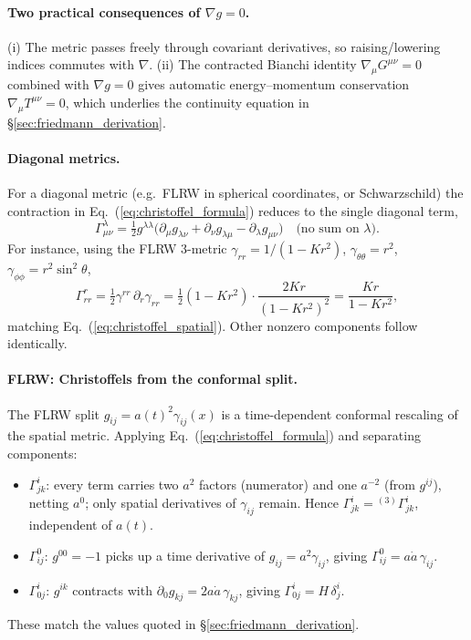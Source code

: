 \documentclass[12pt]{article}
\begin{document}
\paragraph{Two practical consequences of $\nabla g = 0$.}
(i) The metric passes freely through covariant derivatives, so
raising/lowering indices commutes with $\nabla$.  (ii) The contracted
Bianchi identity $\nabla_\mu G^{\mu\nu} = 0$ combined with
$\nabla g = 0$ gives automatic energy--momentum conservation
$\nabla_\mu T^{\mu\nu} = 0$, which underlies the continuity equation
in \S\ref{sec:friedmann_derivation}.

\paragraph{Diagonal metrics.}
For a diagonal metric (e.g.\ FLRW in spherical coordinates, or
Schwarzschild) the contraction in Eq.~(\ref{eq:christoffel_formula})
reduces to the single diagonal term,
%
\begin{equation}
  \Gamma^\lambda_{\mu\nu}
  = \tfrac{1}{2}g^{\lambda\lambda}\bigl(\partial_\mu g_{\lambda\nu}
    + \partial_\nu g_{\lambda\mu} - \partial_\lambda g_{\mu\nu}\bigr)
  \quad\text{(no sum on $\lambda$).}
\end{equation}
%
For instance, using the FLRW 3-metric $\gamma_{rr}=1/(1-Kr^2)$,
$\gamma_{\theta\theta}=r^2$, $\gamma_{\phi\phi}=r^2\sin^2\theta$,
%
\begin{equation}
  \Gamma^r_{rr}
  = \tfrac{1}{2}\gamma^{rr}\,\partial_r\gamma_{rr}
  = \tfrac{1}{2}(1-Kr^2)\cdot\frac{2Kr}{(1-Kr^2)^2}
  = \frac{Kr}{1-Kr^2},
\end{equation}
%
matching Eq.~(\ref{eq:christoffel_spatial}).  Other nonzero components
follow identically.

\paragraph{FLRW: Christoffels from the conformal split.}
The FLRW split $g_{ij} = a(t)^2\gamma_{ij}(x)$ is a time-dependent
conformal rescaling of the spatial metric.  Applying
Eq.~(\ref{eq:christoffel_formula}) and separating components:
\begin{itemize}
  \item $\Gamma^i_{jk}$: every term carries two $a^2$ factors
    (numerator) and one $a^{-2}$ (from $g^{ij}$), netting $a^0$; only
    spatial derivatives of $\gamma_{ij}$ remain.  Hence $\Gamma^i_{jk}
    = {}^{(3)}\Gamma^i_{jk}$, independent of $a(t)$.
  \item $\Gamma^0_{ij}$: $g^{00}=-1$ picks up a time derivative of
    $g_{ij}=a^2\gamma_{ij}$, giving $\Gamma^0_{ij} = a\dot
    a\,\gamma_{ij}$.
  \item $\Gamma^i_{0j}$: $g^{ik}$ contracts with $\partial_0 g_{kj} =
    2a\dot a\,\gamma_{kj}$, giving $\Gamma^i_{0j} = H\,\delta^i_j$.
\end{itemize}
These match the values quoted in \S\ref{sec:friedmann_derivation}.
\end{document}
